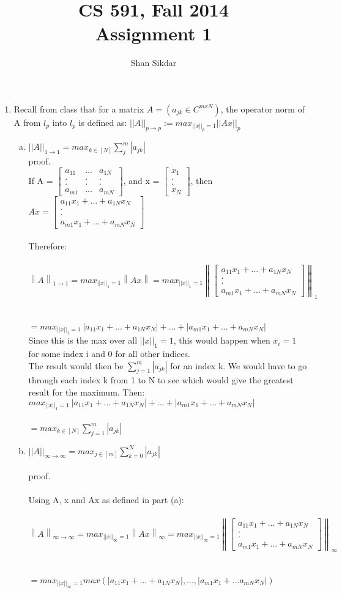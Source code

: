\documentclass[11pt,leqno,fleqn]{article}
\title{CS 591, Fall 2014
       \\[1ex]
       \textbf{Assignment 1}}
\author{Shan Sikdar}
\date{} %
\newcommand{\norm}[1]{\left\lVert#1\right\rVert}
\newcommand{\matrixA}{ $ 
\begin{bmatrix}
  a_{11} & ... & a_{1N} \\
  . & . & . \\
  . & . & .  \\
   a_{m1} & ... & a_{mN}
 \end{bmatrix}
 $}
\newcommand{\vectorX}{ $ 
\begin{bmatrix}
  x_{1} \\
  .  \\
  .   \\
  x_{N}
 \end{bmatrix}
 $}
\newcommand{\vectorAx}{  
\begin{bmatrix}
  a_{11}x_1 + ... + a_{1N}x_N \\
  .  \\

  .   \\
 a_{m1}x_1 + ... + a_{mN}x_N
 \end{bmatrix}
 }
\begin{document}
\maketitle

\begin{enumerate}[(1)]
\item Recall from class that for a matrix $A = (a_{jk} \in C^{m x N})$, the operator norm of A from $l_p$ into $l_p$ is defined as:
$|| A ||_{p \to p} := max_{||x||_p = 1} ||Ax||_p$
\begin{enumerate}[(a)]
 \item $|| A ||_{1 \to 1} = max_{k \in [N]}\sum_j^m |a_{jk}|$\\
 proof.\\
 If  A = \matrixA, and x = \vectorX, then $Ax = \vectorAx$\\ \\
 Therefore:\\ \\
$\norm{A}_{1 \to 1} = max_{||x||_1 = 1} \norm{Ax}  =  max_{||x||_1 = 1} \norm{  \vectorAx }_1$ \\ \\ \\
$ = max_{||x||_1 = 1}   \ |a_{11}x_1 + ... + a_{1N}x_N| + ... + |a_{m1}x_1 + ... + a_{mN}x_N|  $\\ 

Since this is the max over all $||x||_1 = 1$, this would happen when $x_i = 1$  for some index i and 0 for all other indices. \\
The result would then be $\sum_{j=1}^m |a_{jk}|$ for an index k. We would have to go through each index k from 1 to N to see which would give the 
greatest result for the maximum.  Then:\\
$ max_{||x||_1 = 1}   \ |a_{11}x_1 + ... + a_{1N}x_N| + ... + |a_{m1}x_1 + ... + a_{mN}x_N|  $\\  \\
$ = max_{k \in [N]} \sum_{j=1}^m |a_{jk}| $

 \newpage
\item $|| A ||_{\infty \to \infty} = max_{j \in [m]}\sum_{k = 0}^N |a_{jk}|$\\ \\
proof.\\ \\
Using A, x and Ax as defined in part (a):\\ \\
$\norm{A}_{\infty \to \infty} = max_{||x||_{\infty} = 1} \norm{Ax}_{\infty} =  max_{||x||_{\infty} = 1} \norm{  \vectorAx }_{\infty} $ \\ \\ \\
$= max_{||x||_{\infty} = 1} max(| a_{11}x_1 + ... + a_{1N}x_N|, ... , |a_{m1}x_1 + ... a_{mN}x_N| ) $\\


\end{enumerate}
\end{enumerate}
\end{document}

